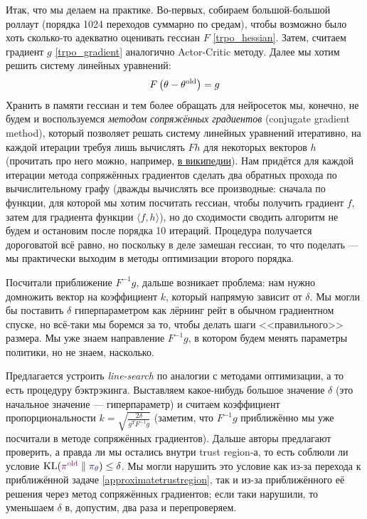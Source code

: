 Итак, что мы делаем на практике. Во-первых, собираем большой-большой роллаут (порядка 1024 переходов суммарно по средам), чтобы возможно было хоть сколько-то адекватно оценивать гессиан $F$ \eqref{trpo_hessian}. Затем, считаем градиент $g$ \eqref{trpo_gradient} аналогично Actor-Critic методу. Далее мы хотим решить систему линейных уравнений:
$$F \left(\theta - \theta^{\mathrm{old}}\right) = g$$
Хранить в памяти гессиан и тем более обращать для нейросеток мы, конечно, не будем и воспользуемся \emph{методом сопряжённых градиентов} (conjugate gradient method), который позволяет решать систему линейных уравнений итеративно, на каждой итерации требуя лишь вычислять $Fh$ для некоторых векторов $h$ (прочитать про него можно, например, \href{https://ru.wikipedia.org/wiki/Метод_сопряжённых_градиентов_(для_решения_СЛАУ)}{в википедии}). Нам придётся для каждой итерации метода сопряжённых градиентов сделать два обратных прохода по вычислительному графу (дважды вычислять все производные: сначала по функции, для которой мы хотим посчитать гессиан, чтобы получить градиент $f$, затем для градиента функции $\langle f, h \rangle$), но до сходимости сводить алгоритм не будем и остановим после порядка 10 итераций. Процедура получается дороговатой всё равно, но поскольку в деле замешан гессиан, то что поделать --- мы практически выходим в методы оптимизации второго порядка.

Посчитали приближение $F^{-1}g$, дальше возникает проблема: нам нужно домножить вектор на коэффициент $k$, который напрямую зависит от $\delta$. Мы могли бы поставить $\delta$ гиперпараметром как лёрнинг рейт в обычном градиентном спуске, но всё-таки мы боремся за то, чтобы делать шаги <<правильного>> размера. Мы уже знаем направление $F^{-1}g$, в котором будем менять параметры политики, но не знаем, насколько.

Предлагается устроить \emph{line-search} по аналогии с методами оптимизации, а то есть процедуру бэктрэкинга. Выставляем какое-нибудь большое значение $\delta$ (это начальное значение --- гиперпараметр) и считаем коэффициент пропорциональности $k = \sqrt{\frac{2 \delta}{g^TF^{-1}g}}$ (заметим, что $F^{-1}g$ приближённо мы уже посчитали в методе сопряжённых градиентов). Дальше авторы предлагают проверить, а правда ли мы остались внутри trust region-а, то есть соблюли ли условие $\KL(\textcolor{ChadPurple}{\pi^{\old}} \parallel \textcolor{ChadBlue}{\pi_\theta}) \HM\le \delta$. Мы могли нарушить это условие как из-за перехода к приближённой задаче \eqref{approximatetrustregion}, так и из-за приближённого её решения через метод сопряжённых градиентов; если таки нарушили, то уменьшаем $\delta$ в, допустим, два раза и перепроверяем.

